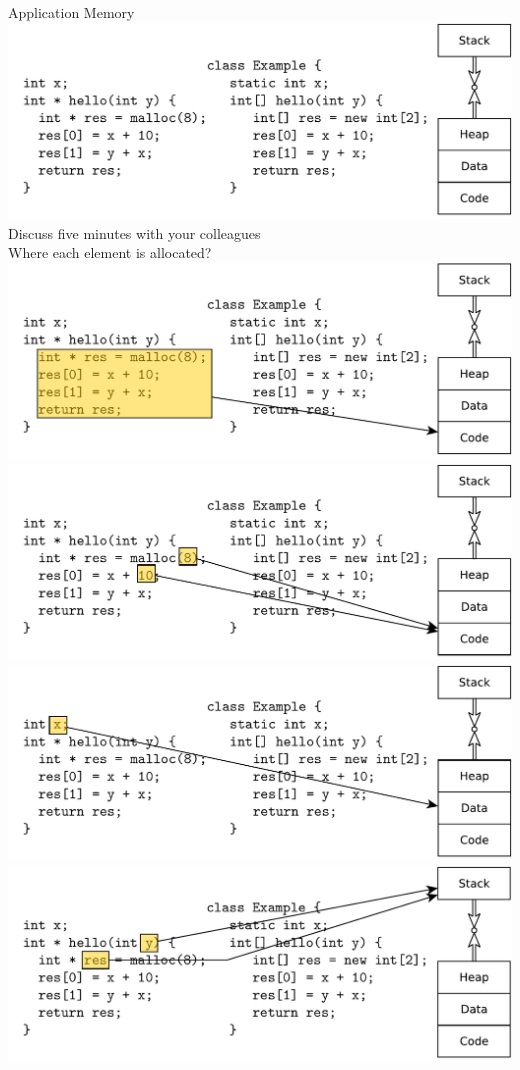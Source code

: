 \documentclass{beamer}
\begin{document}
\begin{frame}[t]{Application Memory}
\center
{     {
  \includegraphics[width=0.9\linewidth]{code1}
}
   {
    Discuss five minutes with your colleagues\\
  }
   {
    Where each element is allocated?
  }
     {
  \includegraphics[width=0.9\linewidth]{code2}
}
     {
  \includegraphics[width=0.9\linewidth]{code3}
}
     {
  \includegraphics[width=0.9\linewidth]{code4}
}
     {
  \includegraphics[width=0.9\linewidth]{code5}
}}
\end{frame}
\end{document}
